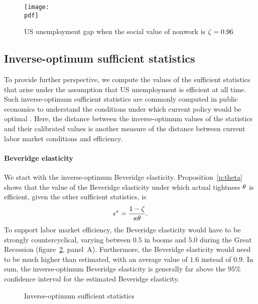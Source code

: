\documentclass[letterpaper,12pt,leqno]{article}
\def\pdf{../../figures/xhosios_202103.pdf}
\begin{document}
\begin{figure}[t]
\texttt{[image: \\pdf]}
\caption{US unemployment gap when the social value of nonwork is $\zeta=0.96$}
\label{f:hm}\end{figure}

\subsection{Inverse-optimum sufficient statistics}

To provide further perspective, we compute the values of the sufficient statistics that arise under the assumption that US unemployment is efficient at all time. Such inverse-optimum sufficient statistics are commonly computed in public economics to understand the conditions under which current policy would be optimal . Here, the distance between the inverse-optimum values of the statistics and their calibrated values is another measure of the distance between current labor market conditions and efficiency.

\paragraph{Beveridge elasticity} We start with the inverse-optimum Beveridge elasticity. Proposition~\ref{p:theta} shows that the value of the Beveridge elasticity under which actual tightness $\theta$ is efficient, given the other sufficient statistics, is
\begin{equation}
\epsilon^* = \frac{1-\zeta}{\kappa\theta}.
\label{e:epsilon}\end{equation}
To support labor market efficiency, the Beveridge elasticity would have to be strongly countercyclical, varying between $0.5$ in booms and $5.0$ during the Great Recession (figure~\ref{f:inverseoptimum}, panel~A). Furthermore, the Beveridge elasticity would need to be much higher than estimated, with an average value of $1.6$ instead of $0.9$. In sum, the inverse-optimum Beveridge elasticity is generally far above the $95\%$ confidence interval for the estimated Beveridge elasticity.

\begin{figure}[t!]
\hfill
{}\vfig
{}
\caption{Inverse-optimum sufficient statistics}
\label{f:inverseoptimum}\end{figure}
\end{document}
